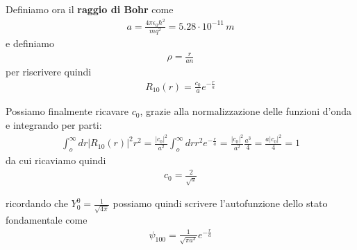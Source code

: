Definiamo ora il \textbf{raggio di Bohr} come
\begin{align}
a= \frac{4\pi\epsilon_0 \hbar^2}{m q^2}= 5.28 \cdot 10^{-11} \, m
\end{align}
e definiamo
\begin{align}
\rho= \frac{r}{an}
\end{align}
per riscrivere quindi
\begin{align}
R_{10}(r)= \frac{c_0}{a}e^{-\frac{r}{a}}
\end{align}

Possiamo finalmente ricavare $c_0$, grazie alla normalizzazione delle funzioni d'onda e integrando per parti:
\begin{align}
\int_o^\infty dr |R_{10}(r)|^2r^2= \frac{|c_0|^2}{a^2} \int_o^\infty dr r^2 e^{-\frac{r}{a}}= \frac{|c_0|^2}{a^2}\frac{a^3}{4}= \frac{a|c_0|^2}{4}=1 
\end{align}
da cui ricaviamo quindi
\begin{align}
c_0= \frac{2}{\sqrt{a}}
\end{align}

ricordando che $Y_0^0 = \frac{1}{\sqrt{4\pi}}$ possiamo quindi scrivere l'autofunzione dello stato fondamentale come
\begin{align}
\psi_{100}= \frac{1}{\sqrt{\pi a^3}}e^{-\frac{r}{a}}
\end{align}

